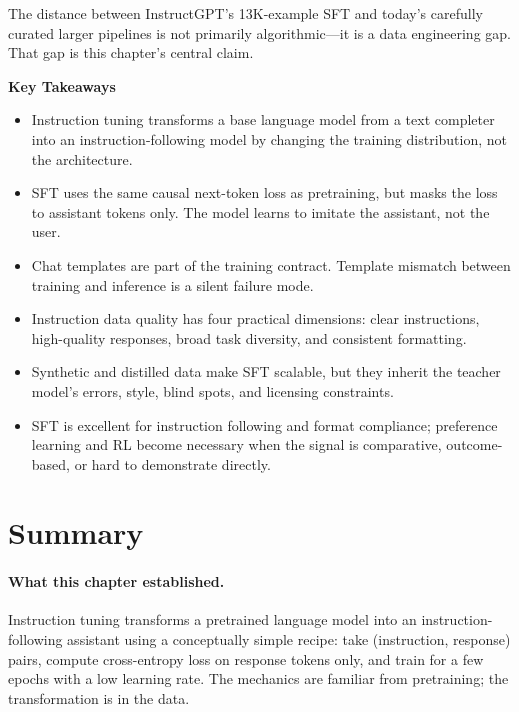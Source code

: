 \noindent The distance between InstructGPT's 13K-example SFT and today's carefully curated larger pipelines is not primarily algorithmic---it is a data engineering gap. That gap is this chapter's central claim.

\begin{takeaways}
\textbf{Key Takeaways}
\begin{itemize}[nosep]
  \item Instruction tuning transforms a base language model from a text completer into an instruction-following model by changing the training distribution, not the architecture.
  \item SFT uses the same causal next-token loss as pretraining, but masks the loss to assistant tokens only. The model learns to imitate the assistant, not the user.
  \item Chat templates are part of the training contract. Template mismatch between training and inference is a silent failure mode.
  \item Instruction data quality has four practical dimensions: clear instructions, high-quality responses, broad task diversity, and consistent formatting.
  \item Synthetic and distilled data make SFT scalable, but they inherit the teacher model's errors, style, blind spots, and licensing constraints.
  \item SFT is excellent for instruction following and format compliance; preference learning and RL become necessary when the signal is comparative, outcome-based, or hard to demonstrate directly.
\end{itemize}
\end{takeaways}


\section*{Summary}

\paragraph{What this chapter established.} Instruction tuning transforms a pretrained language model into an instruction-following assistant using a conceptually simple recipe: take (instruction, response) pairs, compute cross-entropy loss on response tokens only, and train for a few epochs with a low learning rate. The mechanics are familiar from pretraining; the transformation is in the data.


